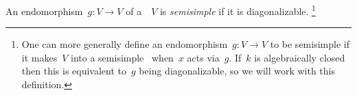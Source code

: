 % 
% 
% 
% 
% 
% 


\begin{definition}
  An endomorphism~$g \colon V \to V$ of a~{\kvs}~$V$ is \emph{semisimple} if it is diagonalizable.%
  \footnote{One can more generally define an endomorphism~$g \colon V \to V$ to be semisimple if it makes~$V$ into a semisimple~\dash{$klx]$}{module} when~$x$ acts via~$g$.
  If~$k$ is algebraically closed then this is equivalent to~$g$ being diagonalizable, so we will work with this definition.}
\end{definition}


